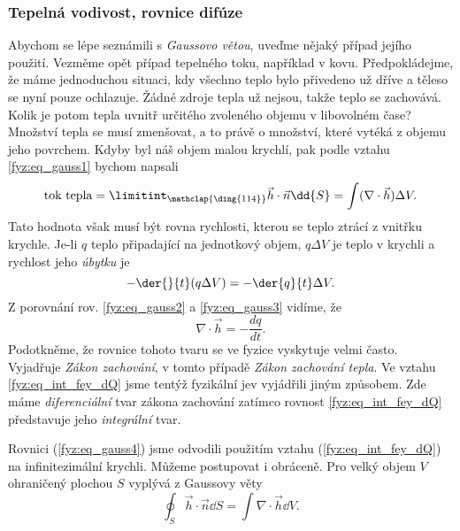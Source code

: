       \subsubsection{Tepelná vodivost, rovnice difúze}
        Abychom se lépe seznámili s \emph{Gaussovo větou}, uveďme nějaký případ jejího použití. 
        Vezměme opět případ tepelného toku, například v kovu. Předpokládejme, že máme jednoduchou 
        situaci, kdy všechno teplo bylo přivedeno už dříve a těleso se nyní pouze ochlazuje. Žádné 
        zdroje tepla už nejsou, takže teplo se zachovává. Kolik je potom tepla uvnitř určitého 
        zvoleného objemu v libovolném čase? Množství tepla se musí zmenšovat, a to právě o množství, 
        které vytéká z objemu jeho povrchem. Kdyby byl náš objem malou krychlí, pak podle vztahu
        \ref{fyz:eq_gauss1} bychom napsali
        \begin{equation}\label{fyz:eq_gauss2}
          \text{tok 
          tepla}=\limitint_{\mathclap{\substack{\text{\ding{114}}}}}\vec{h}\cdot\vec{n}\dd{S} = 
          \int(\nabla\cdot\vec{h})\Delta V.
        \end{equation}
        Tato hodnota však musí být rovna rychlosti, kterou se teplo ztrácí z vnitřku krychle. Je-li 
        $q$ teplo připadající na jednotkový objem, $q\Delta V$ je teplo v krychli a rychlost jeho
        \emph{úbytku} je
        \begin{equation}\label{fyz:eq_gauss3}
          - \der{ }{t}(q\Delta V) = - \der{q}{t}\Delta V.
        \end{equation}
        Z porovnání rov. \ref{fyz:eq_gauss2} a \ref{fyz:eq_gauss3} vidíme, že 
        \begin{equation}\label{fyz:eq_gauss4}
          \nabla\cdot\vec{h} = - \frac{dq}{dt}. 
        \end{equation}
        Podotkněme, že rovnice tohoto tvaru se ve fyzice vyskytuje velmi často. Vyjadřuje
        \emph{Zákon zachování}, v tomto případě \emph{Zákon zachování tepla}. Ve vztahu
        \ref{fyz:eq_int_fey_dQ} jsme tentýž fyzikální jev vyjádřili jiným způsobem. Zde máme
        \emph{diferenciální} tvar zákona zachování zatímco rovnost \ref{fyz:eq_int_fey_dQ}
        představuje jeho \emph{integrální} tvar.
        
        Rovnici (\ref{fyz:eq_gauss4}) jsme odvodili použitím vztahu (\ref{fyz:eq_int_fey_dQ}) na 
        infinitezimální krychli. Můžeme postupovat i obráceně. Pro velký objem \(V\) ohraničený 
        plochou \(S\) vyplývá z Gaussovy věty
        \begin{equation}\label{fyz:eq_gauss5}
          \oint_S\vec{h}\cdot\vec{n}\dd{S} = \int\nabla\cdot\vec{h}\dd{V}.
        \end{equation}
        
